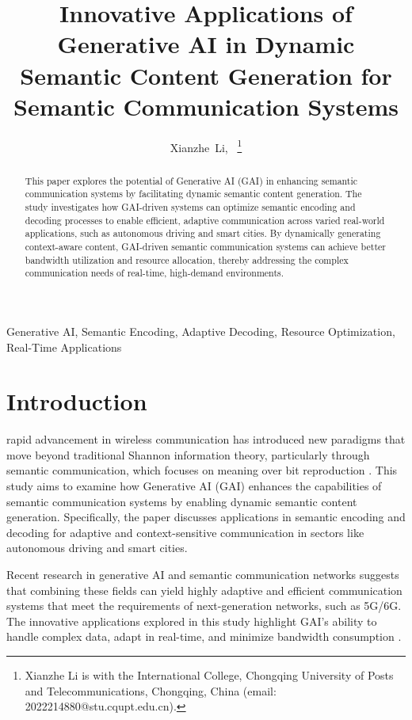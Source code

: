 \documentclass[journal]{IEEEtran}
\title{Innovative Applications of Generative AI in Dynamic Semantic Content Generation for Semantic Communication Systems}
\author{Xianzhe~Li,~\IEEEmembership{Student ID:~2022214880} 
\thanks{Xianzhe Li is with the International College, Chongqing University of Posts and Telecommunications, Chongqing, China (email: 2022214880@stu.cqupt.edu.cn).}
}
\begin{document}
\maketitle

\begin{abstract}
This paper explores the potential of Generative AI (GAI) in enhancing semantic communication systems by facilitating dynamic semantic content generation. The study investigates how GAI-driven systems can optimize semantic encoding and decoding processes to enable efficient, adaptive communication across varied real-world applications, such as autonomous driving and smart cities. By dynamically generating context-aware content, GAI-driven semantic communication systems can achieve better bandwidth utilization and resource allocation, thereby addressing the complex communication needs of real-time, high-demand environments.
\end{abstract}

\begin{IEEEkeywords}
Generative AI, Semantic Encoding, Adaptive Decoding, Resource Optimization, Real-Time Applications
\end{IEEEkeywords}

\IEEEpeerreviewmaketitle

\section{Introduction}
 rapid advancement in wireless communication has introduced new paradigms that move beyond traditional Shannon information theory, particularly through semantic communication, which focuses on meaning over bit reproduction \cite{9530497}. This study aims to examine how Generative AI (GAI) enhances the capabilities of semantic communication systems by enabling dynamic semantic content generation. Specifically, the paper discusses applications in semantic encoding and decoding for adaptive and context-sensitive communication in sectors like autonomous driving and smart cities.

Recent research in generative AI \cite{Radford2018ImprovingLU} and semantic communication networks \cite{10614204,10447237} suggests that combining these fields can yield highly adaptive and efficient communication systems that meet the requirements of next-generation networks, such as 5G/6G. The innovative applications explored in this study highlight GAI’s ability to handle complex data, adapt in real-time, and minimize bandwidth consumption \cite{liu2024semanticcommunicationsartificialintelligence}.
\end{document}

